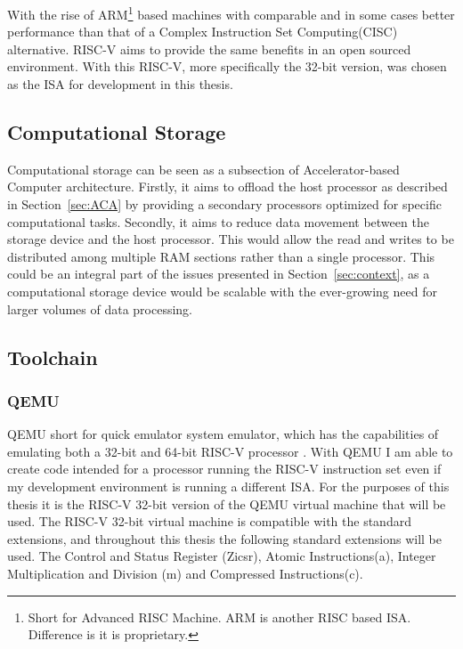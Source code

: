 With the rise of ARM\footnote{Short for Advanced RISC Machine. ARM is another
RISC based ISA. Difference is it is proprietary.} based machines with comparable
and in some cases better performance than that of a Complex Instruction Set
Computing(CISC) alternative\cite{Power_Struggle}. RISC-V aims to provide the
same benefits in an open sourced environment. With this RISC-V, more
specifically the 32-bit version, was chosen as the ISA for development in this
thesis.

\subsection{Computational Storage}
Computational storage can be seen as a subsection of Accelerator-based Computer
architecture. Firstly, it aims to offload the host processor as described in
Section~\ref{sec:ACA} by providing a secondary processors optimized for specific
computational tasks. Secondly, it aims to reduce data movement between the
storage device and the host processor. This would allow the read and writes to
be distributed among multiple RAM sections rather than a single processor. This
could be an integral part of the issues presented in Section~\ref{sec:context},
as a computational storage device would be scalable with the ever-growing nee\label{sec:sys-info}d
for larger volumes of data processing.


\subsection{Toolchain}\label{sec:toolchain}
\subsubsection*{QEMU}
QEMU short for quick emulator system emulator, which has the capabilities of
emulating both a 32-bit and 64-bit RISC-V processor \cite{QEMU}. With QEMU I am
able to create code intended for a processor running the RISC-V instruction set
even if my development environment is running a different ISA. For the purposes
of this thesis it is the RISC-V 32-bit version of the QEMU virtual machine that
will be used. The RISC-V 32-bit virtual machine is compatible with the standard
extensions, and throughout this thesis the following standard extensions will be
used. The Control and Status Register (Zicsr), Atomic Instructions(a), Integer
Multiplication and Division (m) and Compressed Instructions(c).

